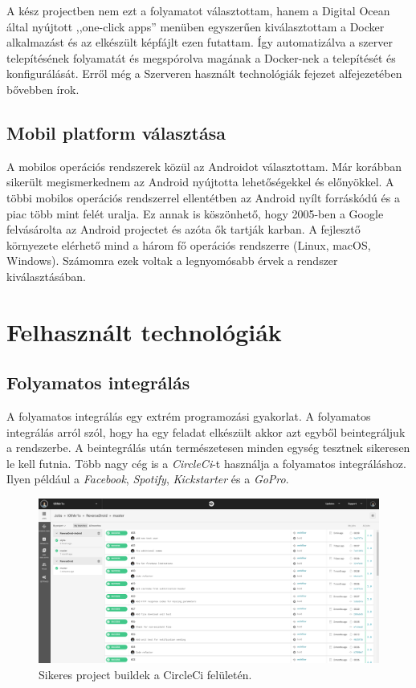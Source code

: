 \documentclass{thesis-ekf}
\theoremstyle{definition}
\theoremstyle{remark}
\begin{document}
A kész projectben nem ezt a folyamatot választottam, hanem a Digital Ocean által nyújtott ,,one-click apps'' menüben egyszerűen kiválasztottam a Docker alkalmazást és az elkészült képfájlt ezen futattam. 
Így automatizálva a szerver telepítésének folyamatát és megspórolva magának a Docker-nek a telepítését és konfigurálását.
Erről még a Szerveren használt technológiák fejezet  alfejezetében bővebben írok.

\section{Mobil platform választása}

A mobilos operációs rendszerek közül az Androidot választottam. Már korábban sikerült megismerkednem az Android nyújtotta lehetőségekkel és előnyökkel.
A többi mobilos operációs rendszerrel ellentétben az Android nyílt forráskódú és a piac több mint felét uralja.
Ez annak is köszönhető, hogy 2005-ben a Google felvásárolta az Android projectet és azóta ők tartják karban.
A fejlesztő környezete elérhető mind a három fő operációs rendszerre (Linux, macOS, Windows).
Számomra ezek voltak a legnyomósabb érvek a rendszer kiválasztásában.

\chapter{Felhasznált technológiák}\label{technologiak}

\section{Folyamatos integrálás}

A folyamatos integrálás egy extrém programozási gyakorlat.
A folyamatos integrálás arról szól, hogy ha egy feladat elkészült akkor azt egyből beintegráljuk a rendszerbe.
A beintegrálás után természetesen minden egység tesztnek sikeresen le kell futnia.
Több nagy cég is a \emph{CircleCi}-t használja a folyamatos integráláshoz.
Ilyen például a \emph{Facebook}, \emph{Spotify}, \emph{Kickstarter} és a \emph{GoPro}.

\begin{figure}[!h]
	\centering
	\includegraphics[width=15cm]{kepek/circle_ci}
	\caption{Sikeres project buildek a CircleCi felületén.}
	\label{circleci}
\end{figure}
\end{document}
